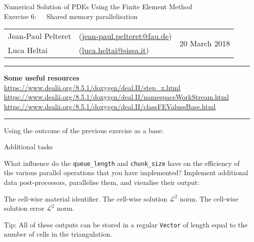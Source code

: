 \documentclass[11pt,answers]{exam}
\makeatletter
\newcommand{\makeheader}[3]{%
\setcounter{question}{0}
\begin{center}
{\sc Numerical Solution of PDEs Using the Finite Element Method}\vspace{2ex}\\
{\sc Exercise #1:\ \ \ #2}\vspace{2ex}\\
\begin{tabular*}{\textwidth}{ll @{\extracolsep{\fill}}r}
Jean-Paul Pelteret & (\url{jean-paul.pelteret@fau.de}) & \multirow{2}{*}{#3} \\
Luca Heltai & (\url{luca.heltai@sissa.it}) & \\
\end{tabular*}
\end{center}
}
\newcommand{\makeresources}[1]{%
\rule{\textwidth}{0.6mm}
\textbf{Some useful resources}\\[1.5ex]
#1 \par
\rule{\textwidth}{0.6mm}
}
\makeatother
\begin{document}
\begin{questions}
\end{questions}




\clearpage
\makeheader{6}{Shared memory parallelisation}{20 March 2018}
\makeresources{%
\url{https://www.dealii.org/8.5.1/doxygen/deal.II/step_x.html} \\
\url{https://www.dealii.org/8.5.1/doxygen/deal.II/namespaceWorkStream.html} \\
\url{https://www.dealii.org/8.5.1/doxygen/deal.II/classFEValuesBase.html}
}

\begin{questions}

\question Using the outcome of the previous exercise as a base:


\question Additional tasks
\begin{parts}
\bonuspart What influence do the \verb|queue_length| and \verb|chunk_size| have on the efficiency of the various parallel operations that you have implemented?
\bonuspart Implement additional data post-processors, parallelise them, and visualise their output:
\begin{subparts}
\subpart The cell-wise material identifier.
\subpart The cell-wise solution $\mathcal{L}^{2}$ norm. %
\subpart The cell-wise solution error $\mathcal{L}^{2}$ norm.
\end{subparts}
Tip: All of these outputs can be stored in a regular \verb|Vector| of length equal to the number of cells in the triangulation.
\end{parts}

\end{questions}
\end{document}
